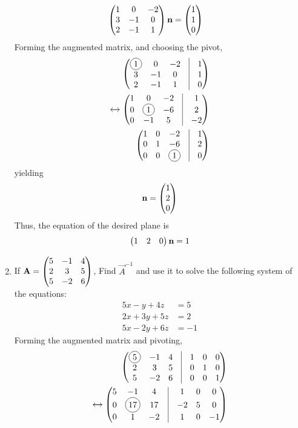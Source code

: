 \documentclass[journal,12pt,twocolumn]{IEEEtran}
\renewcommand\thesection{\arabic{section}}
\begin{document}
\begin{enumerate}[label=\thesection.\arabic*.,ref=\thesection.\theenumi]
\begin{align}
	\begin{pmatrix}1 &0 &-2\\ 3 & -1 &0 \\ 2 & -1 & 1\end{pmatrix} \mathbf{n} &= \begin{pmatrix}1 \\ 1 \\ 0\end{pmatrix}
  \end{align}
Forming the augmented matrix, and choosing the pivot,
\begin{align}
	\myvec{\circled{1} &0 &-2 & \vrule &  1\\ 3 & -1 &0 & \vrule &1\\ 2 & -1 & 1 & \vrule &0} 
	\\
	\xleftrightarrow[]{}
	\myvec{1 &0 &-2 & \vrule &  1\\ 0 & \circled{1} &-6 & \vrule &2\\ 0 & -1 & 5 & \vrule &-2} 
	\\
	\myvec{1 &0 &-2 & \vrule &  1\\ 0 & 1 &-6 & \vrule &2\\ 0 & 0 & \circled{1} & \vrule &0} 
  \end{align}
  yielding 
\begin{align}
\mathbf{n} =\begin{pmatrix}1 \\ 2 \\ 0\end{pmatrix} 
  \end{align}
  Thus, the equation of the desired plane is 
\begin{align}
\begin{pmatrix}1 & 2 & 0\end{pmatrix} \mathbf{n} = 1
  \end{align}
\item If $\mathbf{A}=\begin{pmatrix}5 & -1 & 4 \\ 2 & 3 & 5 \\ 5 & -2 & 6 \end{pmatrix} $, Find $\vec{A}^{-1}$ and use it to solve the following system of the equations: 
\begin{align}
	5x-y+4z&=5 \\
	2x+3y+5z&=2 \\
	5x-2y+6z&=-1 
    \end{align}
   \solution Forming the augmented matrix and pivoting,  
\begin{align}
	\myvec{\circled{5} & -1 & 4 & \vrule & 1 & 0 & 0\\ 2 & 3 & 5 & \vrule & 0 & 1 & 0\\ 5 & -2 & 6 & \vrule & 0 & 0 & 1}
	\\
	\xleftrightarrow []{}
	\myvec{5 & -1 & 4 & \vrule & 1 & 0 & 0\\ 0 & \circled{17} & 17 & \vrule & -2 & 5 & 0\\ 0 & 1 & -2 & \vrule & 1 & 0 & -1}
	\\

\end{align}
\end{enumerate}
\end{document}
